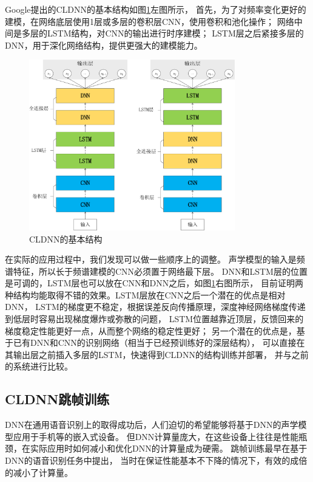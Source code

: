 Google提出的CLDNN的基本结构如图\ref{fig:cldnn}左图所示，
首先，为了对频率变化更好的建模，在网络底层使用1层或多层的卷积层CNN，使用卷积和池化操作；
网络中间是多层的LSTM结构，对CNN的输出进行时序建模；
LSTM层之后紧接多层的DNN，用于深化网络结构，提供更强大的建模能力。


\begin{figure}
\centering
\includegraphics[width=0.8\textwidth]{figures/chapter3/cldnn-crop}
\caption{CLDNN的基本结构}
\label{fig:cldnn}
\end{figure}

在实际的应用过程中，我们发现可以做一些顺序上的调整。
声学模型的输入是频谱特征，所以长于频谱建模的CNN必须置于网络最下层。
DNN和LSTM层的位置是可调的，LSTM层也可以放在CNN和DNN之后，如图\ref{fig:cldnn}右图所示，
目前证明两种结构均能取得不错的效果。LSTM层放在CNN之后一个潜在的优点是相对DNN，
LSTM的梯度更不稳定，根据误差反向传播原理，深度神经网络梯度传递到低层时容易出现梯度爆炸或弥散的问题，
LSTM位置越靠近顶层，反馈回来的梯度稳定性能更好一点，从而整个网络的稳定性更好；
另一个潜在的优点是，基于已有DNN和CNN的识别网络（相当于已经预训练好的深层结构），
可以直接在其输出层之前插入多层的LSTM，快速得到CLDNN的结构训练并部署，
并与之前的系统进行比较。


\subsection{CLDNN跳帧训练}

DNN在通用语音识别上的取得成功后，人们迫切的希望能够将基于DNN的声学模型应用于手机等的嵌入式设备。
但DNN计算量庞大，在这些设备上往往是性能瓶颈，在实际应用时如何减小和优化DNN的计算量成为硬需。
跳帧训练最早在基于DNN的语音识别任务中提出，
当时在保证性能基本不下降的情况下，有效的成倍的减小了计算量。

